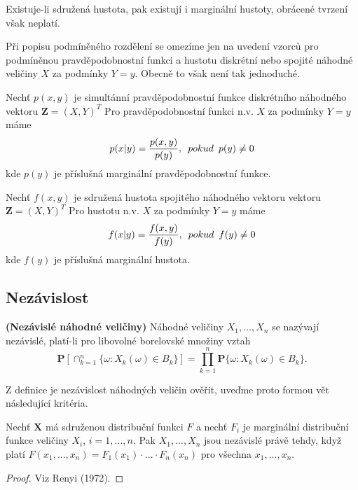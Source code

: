 \begin{remark}
Existuje-li sdružená hustota, pak existují i marginální hustoty, obrácené tvrzení však neplatí.
\end{remark}

Při popisu podmíněného rozdělení se omezíme jen na uvedení vzorců  pro podmíněnou pravděpodobnostní funkci a hustotu diskrétní nebo spojité náhodné veličiny $X$ za podmínky $Y = y$. Obecně to však není tak jednoduché.


Nechť $p(x,y)$ je simultánní pravděpodobnostní funkce diskrétního náhodného vektoru $\textbf{Z} = (X, Y)^{T}$ Pro pravděpodobnostní funkci n.v. $X$ za podmínky $Y = y$ máme 
\begin{equation}
p(x|y) = \frac{p(x,y)}{p(y)}, \enskip pokud \enskip p(y) \neq 0
\end{equation}
kde $p(y)$ je příslušná marginální pravděpodobnostní funkce.

Nechť $f(x,y)$ je sdružená hustota spojitého náhodného vektoru vektoru $\textbf{Z} = (X, Y)^{T}$ Pro hustotu n.v. $X$ za podmínky $Y = y$ máme 
\begin{equation}
f(x|y) = \frac{f(x,y)}{f(y)}, \enskip pokud \enskip f(y) \neq 0
\end{equation}
kde $f(y)$ je příslušná marginální hustota.

\subsection{Nezávislost}
\begin{definition}{\textbf{(Nezávislé náhodné veličiny)}}
Náhodné veličiny $X_{1}, ..., X_{n}$ se nazývají nezávislé, platí-li pro libovolné borelovské množiny vztah
\begin{equation}
\textbf{P}[\cap_{k=1}^{n}\lbrace \omega : X_{k}(\omega) \in B_{k}\rbrace] = \prod_{k = 1}^{n} \textbf{P}\lbrace \omega : X_{k}(\omega) \in B_{k} \rbrace.
\end{equation}
\end{definition}

Z definice je nezávislost náhodných veličin ověřit, uveďme proto formou vět následující kritéria.
\begin{theorem}\label{Kriterium1}
Nechť $\textbf{X}$ má sdruženou distribuční funkci $F$ a nechť $F_{i}$ je marginální distribuční funkce veličiny $X_{i}$, $i = 1, ..., n$. Pak $X_{1}, ..., X_{n}$ jsou nezávislé právě tehdy, když platí $F(x_{1}, ..., x_{n}) = F_{1}(x_{1})\cdot ... \cdot F_{n}(x_{n})$ pro všechna $x_{1}, ..., x_{n}$.
\end{theorem}
\begin{proof}
Viz Renyi (1972).
\end{proof}

